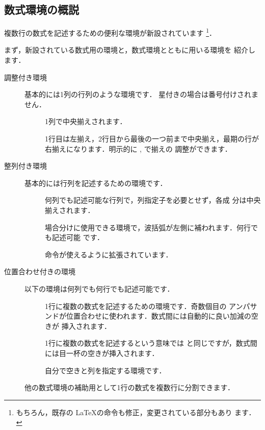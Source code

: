 \subsection{\texorpdfstring{}の数式環境の概説}


複数行の数式を記述するための便利な環境が新設されています%
\footnote{もちろん，既存の \LaTeX の命令も修正，変更されている部分もあり
ます．}．

まず，新設されている数式用の環境と，数式環境とともに用いる環境を
紹介します．

\begin{description}
 \item[調整付き環境] 基本的には1列の行列のような環境です．
  星付きの場合は番号付けされません．
 \begin{description}
 \item[] 1列で中央揃えされます．
 \item[] 
  1行目は左揃え，2行目から最後の一つ前まで中央揃え，最期の行が
 右揃えになります．明示的に ,  で揃えの
 調整ができます．
 \end{description}
 \item[整列付き環境] 基本的には行列を記述するための環境です．
 \begin{description}
  \item[] 何列でも記述可能な行列で，列指定子を必要とせず，各成
  分は中央揃えされます．
  \item[]  
  場合分けに使用できる環境で，波括弧が左側に補われます．何行でも記述可能
  です．
  \item[] 命令が使えるように拡張されています．
 \end{description}

 \item[位置合わせ付きの環境] 以下の環境は何列でも何行でも記述可能です．
 \begin{description}
  \item[] 1行に複数の数式を記述するための環境です．奇数個目の
アンパサンドが位置合わせに使われます．数式間には自動的に良い加減の空きが
挿入されます．
  \item[]  1行に複数の数式を記述するという意味では
と同じですが，数式間には目一杯の空きが挿入されます．
  \item[] 自分で空きと列を指定する環境です．
 \end{description}
  \item[] 他の数式環境の補助用として1行の数式を複数行に分割できます．
\end{description}


